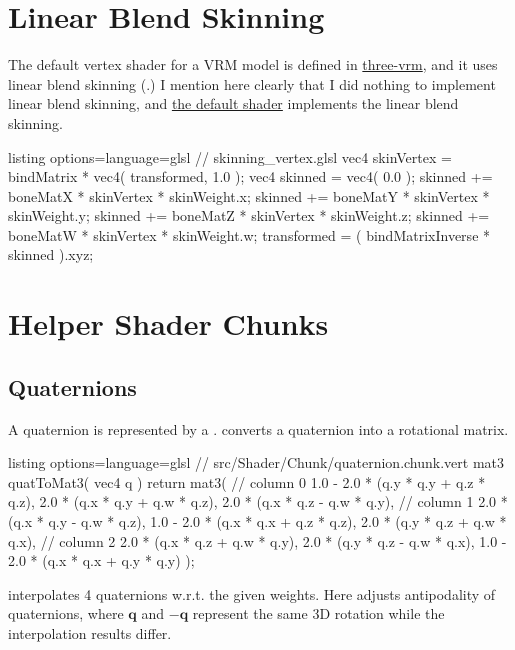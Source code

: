 \documentclass{homework}
\begin{document}
\section{Linear Blend Skinning}
The default vertex shader for a VRM model is defined in \href{https://github.com/pixiv/three-vrm/blob/dev/packages/three-vrm/src/material/shaders/mtoon.vert}{three-vrm}, and it uses linear blend skinning (.) I mention here clearly that I did nothing to implement linear blend skinning, and \href{https://github.com/mrdoob/three.js/blob/dev/src/renderers/shaders/ShaderChunk/skinning_vertex.glsl.js}{the default shader} implements the linear blend skinning.

\begin{tcblisting}{listing options={language=glsl}}
// skinning_vertex.glsl
	vec4 skinVertex = bindMatrix * vec4( transformed, 1.0 );
	vec4 skinned = vec4( 0.0 );
	skinned += boneMatX * skinVertex * skinWeight.x;
	skinned += boneMatY * skinVertex * skinWeight.y;
	skinned += boneMatZ * skinVertex * skinWeight.z;
	skinned += boneMatW * skinVertex * skinWeight.w;
	transformed = ( bindMatrixInverse * skinned ).xyz;
\end{tcblisting}

\section{Helper Shader Chunks}
\subsection{Quaternions}

A quaternion is represented by a .  converts a quaternion into a rotational matrix.

\begin{tcblisting}{listing options={language=glsl}}
// src/Shader/Chunk/quaternion.chunk.vert
mat3 quatToMat3( vec4 q ) {
  return mat3(
    // column 0
    1.0 - 2.0 * (q.y * q.y + q.z * q.z), 2.0 * (q.x * q.y + q.w * q.z),
    2.0 * (q.x * q.z - q.w * q.y),
    // column 1
    2.0 * (q.x * q.y - q.w * q.z),       1.0 - 2.0 * (q.x * q.x + q.z * q.z),
    2.0 * (q.y * q.z + q.w * q.x),
    // column 2
    2.0 * (q.x * q.z + q.w * q.y),       2.0 * (q.y * q.z - q.w * q.x),
    1.0 - 2.0 * (q.x * q.x + q.y * q.y)
  );
}
\end{tcblisting}

 interpolates 4 quaternions w.r.t. the given weights. Here  adjusts antipodality of quaternions, where $\mathbf q$ and $-\mathbf q$ represent the same 3D rotation while the interpolation results differ.
\end{document}
